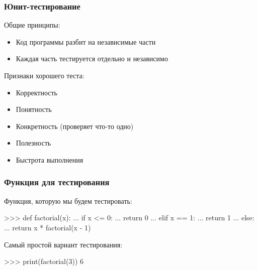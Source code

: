\documentclass[fleqn, xcolor=x11names]{beamer}
\begin{document}
\begin{frame}[fragile]\frametitle{Юнит-тестирование}

Общие принципы:
\begin{itemize}
\item Код программы разбит на независимые части

\item Каждая часть тестируется отдельно и независимо
\end{itemize}

\hfill

Признаки хорошего теста:
\begin{itemize}
\item Корректность

\item Понятность

\item Конкретность (проверяет что-то одно)

\item Полезность 

\item Быстрота выполнения
\end{itemize}

\end{frame}


\begin{frame}[fragile]\frametitle{Функция для тестирования}
Функция, которую мы будем тестировать:
\begin{pcode}
>>> def factorial(x):
...    if x <= 0:
...        return 0
...    elif x == 1:
...        return 1
...    else:
...        return x * factorial(x - 1)
\end{pcode}

\hfill

Самый простой вариант тестирования:
\begin{pcode}
>>> print(factorial(3))
6
\end{pcode}



\end{frame}
\end{document}
